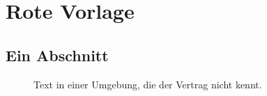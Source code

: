 \chapter{Rote Vorlage}\label{c98}

\section{Ein Abschnitt}\label{c98.s1}

\begin{figure}
Text in einer Umgebung, die der Vertrag nicht kennt.
\end{figure}
